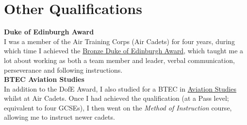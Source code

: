 \documentclass[9pt,a4paper]{article}
\begin{document}
\pagebreak
\section{Other Qualifications}
\textbf{Duke of Edinburgh Award}\\
I was a member of the Air Training Corps (Air Cadets) for four years, during which time I achieved the \underline{Bronze Duke of Edinburgh Award}, which taught me a lot about working as both a team member and leader, verbal communication, perseverance and following instructions.\\\linebreak
\textbf{BTEC Aviation Studies}\\
In addition to the DofE Award, I also studied for a BTEC in \underline{Aviation Studies} whilst at Air Cadets. Once I had achieved the qualification (at a Pass level; equivalent to four GCSEs), I then went on the \emph{Method of Instruction} course, allowing me to instruct newer cadets.
\end{document}
